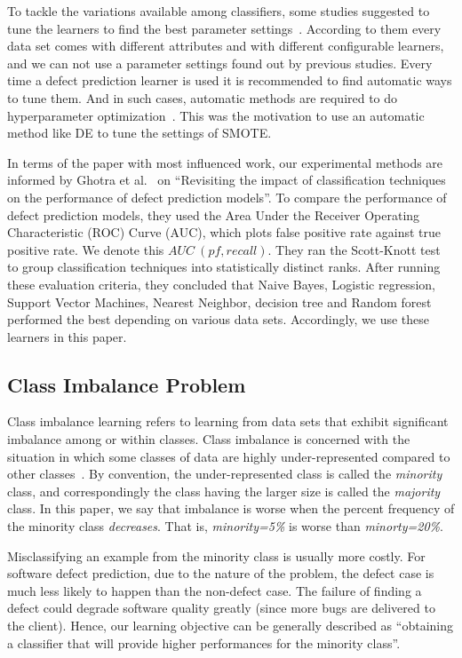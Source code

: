 \documentclass[sigconf,review, anonymous]{acmart}
\theoremstyle{break}
\theoremstyle{break}
\begin{document}
To tackle the variations available among classifiers, some studies suggested to tune the learners to find the best parameter settings~\cite{tantithamthavorn2016automated, fu2016tuning}.  According to them every data set comes with different attributes and with different configurable learners, and we can not use a parameter settings found out by previous studies. Every time a defect prediction learner is used it is recommended to find automatic ways to tune them. And in such cases, automatic 
methods are required to do hyperparameter optimization~\cite{agrawal2016wrong, fu2016tuning}. This was the motivation to use an automatic method like DE to
tune the settings of SMOTE.

In terms of the paper with most influenced work,
our experimental methods are informed 
by  Ghotra et al.~\cite{ghotra2015revisiting} on ``Revisiting the impact of classification techniques on the performance of defect prediction models''. To 
compare  the  performance  of  defect prediction  models,  they  used  the  Area  Under  the Receiver Operating Characteristic (ROC) Curve (AUC), which plots   false  positive  rate  against   true  positive rate. We denote this $AUC\ (pf, recall)$. 
They ran the Scott-Knott test to group classification techniques into statistically distinct ranks. After running these evaluation criteria, they concluded that Naive Bayes, Logistic regression, Support Vector Machines, Nearest Neighbor, decision tree and Random forest performed the best depending on various data sets. Accordingly, 
we use these learners in this paper.

\subsection{Class Imbalance Problem}
\label{sect:motivation}

Class imbalance learning refers to learning from data sets that exhibit significant imbalance among or within classes. Class imbalance  is concerned with the situation in which some classes of data are
highly under-represented compared to other classes~\cite{he2009learning}. By convention,
the under-represented class is called the {\em minority} class,
and correspondingly the class having the larger size is called the
{\em majority} class. In this paper, we say that imbalance is worse when the percent frequency of
the minority class {\em decreases}. That is,
{\em minority=5\%} is worse than {\em minorty=20\%}.

Misclassifying an example from the minority class is usually more costly. For software defect prediction, due to the nature of the problem, the defect case is much less likely to happen than the non-defect case.  The failure of finding a defect could degrade software quality greatly (since more bugs
are delivered to the client). Hence,
our learning objective can be generally described
as ``obtaining a classifier that will provide higher performances for the minority class''.
\end{document}
